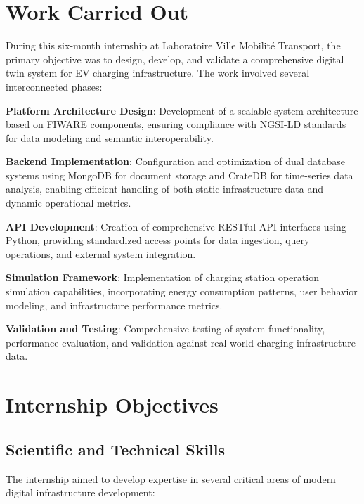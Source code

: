 \section{Work Carried Out}

During this six-month internship at Laboratoire Ville Mobilité Transport, the primary objective was to design, develop, and validate a comprehensive digital twin system for EV charging infrastructure. The work involved several interconnected phases:

\textbf{Platform Architecture Design}: Development of a scalable system architecture based on FIWARE components, ensuring compliance with NGSI-LD standards for data modeling and semantic interoperability.

\textbf{Backend Implementation}: Configuration and optimization of dual database systems using MongoDB for document storage and CrateDB for time-series data analysis, enabling efficient handling of both static infrastructure data and dynamic operational metrics.

\textbf{API Development}: Creation of comprehensive RESTful API interfaces using Python, providing standardized access points for data ingestion, query operations, and external system integration.

\textbf{Simulation Framework}: Implementation of charging station operation simulation capabilities, incorporating energy consumption patterns, user behavior modeling, and infrastructure performance metrics.

\textbf{Validation and Testing}: Comprehensive testing of system functionality, performance evaluation, and validation against real-world charging infrastructure data.

\section{Internship Objectives}

\subsection{Scientific and Technical Skills}

The internship aimed to develop expertise in several critical areas of modern digital infrastructure development:

